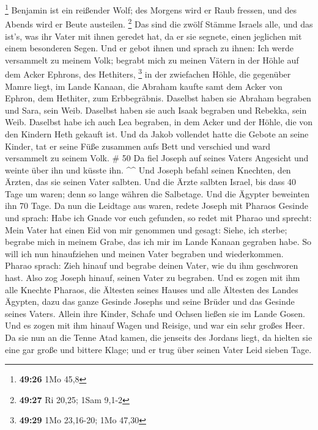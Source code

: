\footnote{\textbf{49:26} 1Mo 45,8}  Benjamin ist ein
reißender Wolf; des Morgens wird er Raub fressen, und des Abends wird er
Beute austeilen. \footnote{\textbf{49:27} Ri 20,25; 1Sam 9,1-2}
 Das sind die zwölf Stämme Israels alle, und das ist's,
was ihr Vater mit ihnen geredet hat, da er sie segnete, einen jeglichen
mit einem besonderen Segen.  Und er gebot ihnen und
sprach zu ihnen: Ich werde versammelt zu meinem Volk; begrabt mich zu
meinen Vätern in der Höhle auf dem Acker Ephrons, des Hethiters,
\footnote{\textbf{49:29} 1Mo 23,16-20; 1Mo 47,30}  in der
zwiefachen Höhle, die gegenüber Mamre liegt, im Lande Kanaan, die
Abraham kaufte samt dem Acker von Ephron, dem Hethiter, zum
Erbbegräbnis.  Daselbst haben sie Abraham begraben und
Sara, sein Weib. Daselbst haben sie auch Isaak begraben und Rebekka,
sein Weib. Daselbst habe ich auch Lea begraben,  in dem
Acker und der Höhle, die von den Kindern Heth gekauft ist.
 Und da Jakob vollendet hatte die Gebote an seine Kinder,
tat er seine Füße zusammen aufs Bett und verschied und ward versammelt
zu seinem Volk. \# 50  Da fiel Joseph auf seines Vaters
Angesicht und weinte über ihn und küsste ihn. \^{}\^{} 
Und Joseph befahl seinen Knechten, den Ärzten, das sie seinen Vater
salbten. Und die Ärzte salbten Israel,  bis dass 40 Tage
um waren; denn so lange währen die Salbetage. Und die Ägypter beweinten
ihn 70 Tage.  Da nun die Leidtage aus waren, redete Joseph
mit Pharaos Gesinde und sprach: Habe ich Gnade vor euch gefunden, so
redet mit Pharao und sprecht:  Mein Vater hat einen Eid
von mir genommen und gesagt: Siehe, ich sterbe; begrabe mich in meinem
Grabe, das ich mir im Lande Kanaan gegraben habe. So will ich nun
hinaufziehen und meinen Vater begraben und wiederkommen. 
Pharao sprach: Zieh hinauf und begrabe deinen Vater, wie du ihm
geschworen hast.  Also zog Joseph hinauf, seinen Vater zu
begraben. Und es zogen mit ihm alle Knechte Pharaos, die Ältesten seines
Hauses und alle Ältesten des Landes Ägypten,  dazu das
ganze Gesinde Josephs und seine Brüder und das Gesinde seines Vaters.
Allein ihre Kinder, Schafe und Ochsen ließen sie im Lande Gosen.
 Und es zogen mit ihm hinauf Wagen und Reisige, und war
ein sehr großes Heer.  Da sie nun an die Tenne Atad
kamen, die jenseits des Jordans liegt, da hielten sie eine gar große und
bittere Klage; und er trug über seinen Vater Leid sieben Tage.

